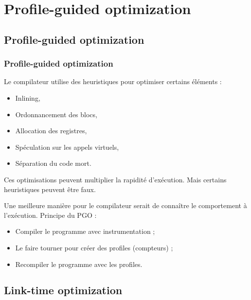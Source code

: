 \documentclass{beamer}
\begin{document}
\section{Profile-guided optimization}

\begin{frame}
    \tableofcontents[currentsection]
\end{frame}

\subsection{Profile-guided optimization}

\begin{frame}
    \frametitle{Profile-guided optimization}

    Le compilateur utilise des heuristiques pour optimiser certains éléments :
    \begin{itemize}
        \item Inlining,
        \item Ordonnancement des blocs,
        \item Allocation des registres,
        \item Spéculation sur les appels virtuels,
        \item Séparation du code mort.
    \end{itemize}
    Ces optimisations peuvent multiplier la rapidité d'exécution.
    Mais certains heuristiques peuvent être faux.
\end{frame}

\begin{frame}
    Une meilleure manière pour le compilateur serait de connaître le comportement à l'exécution.
    Principe du PGO :
    \begin{itemize}
        \item Compiler le programme avec instrumentation ;
        \item Le faire tourner pour créer des profiles (compteurs) ;
        \item Recompiler le programme avec les profiles.
    \end{itemize}
\end{frame}

\subsection{Link-time optimization}
\end{document}
